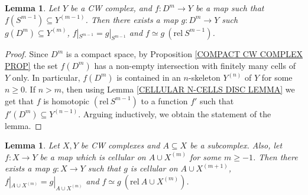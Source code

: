 \documentclass[11pt, letterpaper, oneside]{report}
\theoremstyle{pplain}
\newtheorem{lemma}[theorem]{Lemma}
\theoremstyle{ddefinition}
\theoremstyle{nnn}
\theoremstyle{eexercise}
\newcommand{\rel}{\mathrm{rel\ }}
\begin{document}
\begin{lemma}
\label{CELLULAR DISC LEMMA}
Let $Y$ be a CW complex, and $f\colon D^{m} \to Y$ be a map such that 
$f(S^{m-1})\subseteq Y^{(m-1)}$. Then there exists a map $g\colon D^{m} \to Y$
such $g(D^{m})\subseteq Y^{(m)}$, $f|_{S^{m-1}} = g|_{S^{m-1}}$ and $f\simeq g \ (\rel S^{m-1})$.
\end{lemma}

\begin{proof}
Since $D^{m}$ is a compact space, by Proposition \ref{COMPACT CW COMPLEX PROP}
the set $f(D^{m})$ has a non-empty intersection with finitely many cells of $Y$ only. 
In particular, $f(D^{m})$ is contained in an $n$-skeleton $Y^{(n)}$ of $Y$ for some $n \geq 0$. 
If $n > m$, then using Lemma \ref{CELLULAR N-CELLS DISC LEMMA} we get 
that $f$ is homotopic $(\rel S^{m-1})$ to a function $f'$ such that $f'(D^{m})\subseteq Y^{(n-1)}$. 
Arguing inductively, we obtain the statement of the lemma. 
\end{proof}


\begin{lemma}
\label{CELLULAR INDUCTIVE LEMMA}
Let $X, Y$ be CW complexes and $A\subseteq X$ be a subcomplex. Also, let $f\colon X \to Y$
be a map which is cellular on $A\cup X^{(m)}$ for some $m\geq -1$. Then there exists a map 
$g\colon X \to Y$ such that $g$ is cellular on $A\cup X^{(m+1)}$, 
$f|_{A \cup X^{(m)}} = g|_{A\cup X^{(m)}} $  and  $f\simeq g \ (\rel A\cup X^{(m)})$.
\end{lemma}
\end{document}
